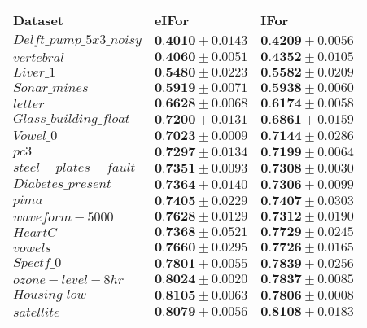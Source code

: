 \documentclass{article}
\begin{document}
\begin{tabular}{lll}
\hline
 Dataset                   & eIFor                         & IFor                          \\
\hline
 $Delft\_pump\_5x3\_noisy$ & $\textbf{0.4010}  \pm 0.0143$ & $\textbf{0.4209}  \pm 0.0056$ \\
 $vertebral$               & $\textbf{0.4060}  \pm 0.0051$ & $\textbf{0.4352}  \pm 0.0105$ \\
 $Liver\_1$                & $\textbf{0.5480}  \pm 0.0223$ & $\textbf{0.5582}  \pm 0.0209$ \\
 $Sonar\_mines$            & $\textbf{0.5919}  \pm 0.0071$ & $\textbf{0.5938}  \pm 0.0060$ \\
 $letter$                  & $\textbf{0.6628}  \pm 0.0068$ & $\textbf{0.6174}  \pm 0.0058$ \\
 $Glass\_building\_float$  & $\textbf{0.7200}  \pm 0.0131$ & $\textbf{0.6861}  \pm 0.0159$ \\
 $Vowel\_0$                & $\textbf{0.7023}  \pm 0.0009$ & $\textbf{0.7144}  \pm 0.0286$ \\
 $pc3$                     & $\textbf{0.7297}  \pm 0.0134$ & $\textbf{0.7199}  \pm 0.0064$ \\
 $steel-plates-fault$      & $\textbf{0.7351}  \pm 0.0093$ & $\textbf{0.7308}  \pm 0.0030$ \\
 $Diabetes\_present$       & $\textbf{0.7364}  \pm 0.0140$ & $\textbf{0.7306}  \pm 0.0099$ \\
 $pima$                    & $\textbf{0.7405}  \pm 0.0229$ & $\textbf{0.7407}  \pm 0.0303$ \\
 $waveform-5000$           & $\textbf{0.7628}  \pm 0.0129$ & $\textbf{0.7312}  \pm 0.0190$ \\
 $HeartC$                  & $\textbf{0.7368}  \pm 0.0521$ & $\textbf{0.7729}  \pm 0.0245$ \\
 $vowels$                  & $\textbf{0.7660}  \pm 0.0295$ & $\textbf{0.7726}  \pm 0.0165$ \\
 $Spectf\_0$               & $\textbf{0.7801}  \pm 0.0055$ & $\textbf{0.7839}  \pm 0.0256$ \\
 $ozone-level-8hr$         & $\textbf{0.8024}  \pm 0.0020$ & $\textbf{0.7837}  \pm 0.0085$ \\
 $Housing\_low$            & $\textbf{0.8105}  \pm 0.0063$ & $\textbf{0.7806}  \pm 0.0008$ \\
 $satellite$               & $\textbf{0.8079}  \pm 0.0056$ & $\textbf{0.8108}  \pm 0.0183$ \\

\end{tabular}
\end{document}
